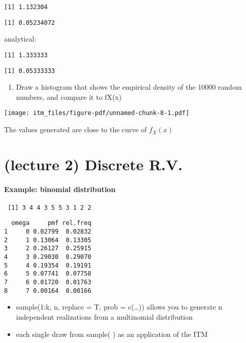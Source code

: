 \documentclass[
  letterpaper,
  DIV=11,
  numbers=noendperiod]{scrreprt}
\providecommand{\tightlist}{%
  \setlength{\itemsep}{0pt}\setlength{\parskip}{0pt}}\usepackage{longtable,booktabs,array}
\begin{document}
\begin{verbatim}
[1] 1.132304
\end{verbatim}

\begin{verbatim}
[1] 0.05234072
\end{verbatim}

analytical:

\begin{verbatim}
[1] 1.333333
\end{verbatim}

\begin{verbatim}
[1] 0.05333333
\end{verbatim}

\begin{enumerate}
\def\labelenumi{\arabic{enumi}.}
\setcounter{enumi}{9}
\tightlist
\item
  Draw a histogram that shows the empirical density of the 10000 random
  numbers, and compare it to fX(x)
\end{enumerate}

\texttt{[image: itm\_files/figure-pdf/unnamed-chunk-8-1.pdf]}

The values generated are close to the curve of \(f_X(x)\)

\chapter{(lecture 2) Discrete R.V.}\label{lecture-2-discrete-r.v.}

\subsubsection{Example: binomial
distribution}\label{example-binomial-distribution}

\begin{verbatim}
 [1] 3 4 4 3 5 5 3 1 2 2
\end{verbatim}

\begin{verbatim}
  omega     pmf rel.freq
1     0 0.02799  0.02832
2     1 0.13064  0.13305
3     2 0.26127  0.25915
4     3 0.29030  0.29070
5     4 0.19354  0.19191
6     5 0.07741  0.07758
7     6 0.01720  0.01763
8     7 0.00164  0.00166
\end{verbatim}

\begin{itemize}
\item
  sample(1:k, n, replace = T, prob = c(\ldots)) allows you to generate n
  independent realizations from a multinomial distribution
\item
  each single draw from sample( ) as an application of the ITM
\end{itemize}
\end{document}
